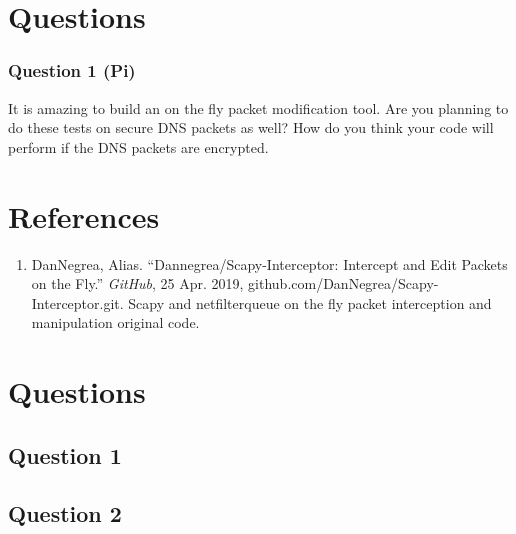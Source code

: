\section{Questions}
\subsubsection{Question 1 (Pi)}
It is amazing to build an on the fly packet modification tool. Are you planning to do these tests on secure DNS packets as well? How do you think your code will perform if the DNS packets are encrypted.

\section{References}
\begin{enumerate}
    \item[] DanNegrea, Alias. “Dannegrea/Scapy-Interceptor: Intercept and Edit Packets on the Fly.” \textit{GitHub}, 25 Apr. 2019, github.com/DanNegrea/Scapy-Interceptor.git. Scapy and netfilterqueue on the fly packet interception and manipulation original code.
\end{enumerate}

\section{Questions}
\subsection{Question 1}
\paragraph{}
\subsection{Question 2}
\paragraph{}